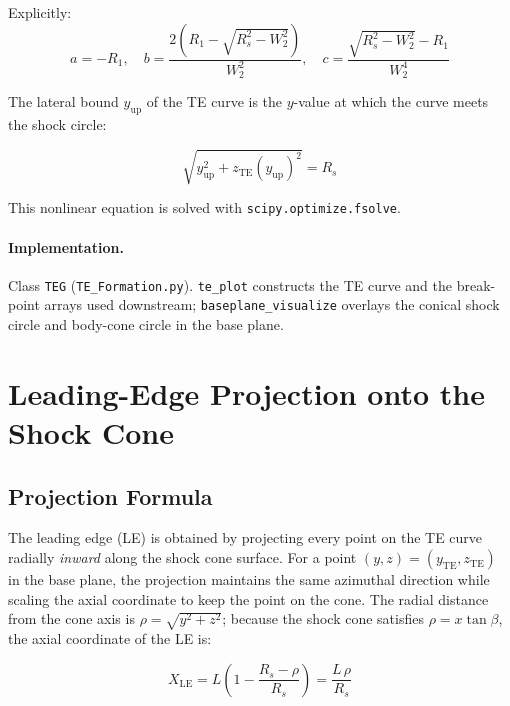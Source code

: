 \documentclass[12pt,a4paper]{article}
\begin{document}
Explicitly:
\begin{equation}
    a = -R_1, \quad
    b = \frac{2\!\left(R_1 - \sqrt{R_s^2 - W_2^2}\right)}{W_2^2}, \quad
    c = \frac{\sqrt{R_s^2 - W_2^2} - R_1}{W_2^4}
    \label{eq:abc}
\end{equation}

The lateral bound $y_{\mathrm{up}}$ of the TE curve is the $y$-value at which
the curve meets the shock circle:

\begin{equation}
    \sqrt{y_{\mathrm{up}}^2 + z_{\mathrm{TE}}(y_{\mathrm{up}})^2} = R_s
    \label{eq:yup}
\end{equation}

This nonlinear equation is solved with \texttt{scipy.optimize.fsolve}.

\paragraph{Implementation.}
Class \texttt{TEG} (\texttt{TE\_Formation.py}).
\texttt{te\_plot} constructs the TE curve and the break-point arrays used
downstream; \texttt{baseplane\_visualize} overlays the conical shock circle and
body-cone circle in the base plane.

\section{Leading-Edge Projection onto the Shock Cone}
\label{sec:LE}

\subsection{Projection Formula}

The leading edge (LE) is obtained by projecting every point on the TE curve
radially \emph{inward} along the shock cone surface.  For a point
$(y, z) = (y_{\mathrm{TE}}, z_{\mathrm{TE}})$ in the base plane, the
projection maintains the same azimuthal direction while scaling the axial
coordinate to keep the point on the cone.  The radial distance from the cone
axis is $\rho = \sqrt{y^2 + z^2}$; because the shock cone satisfies
$\rho = x\tan\beta$, the axial coordinate of the LE is:

\begin{equation}
    X_{\mathrm{LE}} = L\left(1 - \frac{R_s - \rho}{R_s}\right)
                    = \frac{L\,\rho}{R_s}
    \label{eq:LE_x}
\end{equation}
\end{document}
